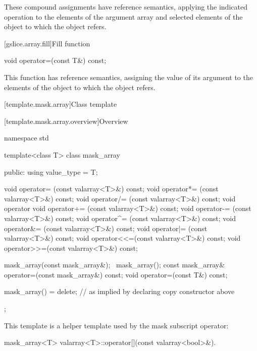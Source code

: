 \begin{itemdescr}
\pnum
These compound assignments have reference semantics, applying the
indicated operation to the elements of the argument array and selected
elements of the
object to which the
object refers.
\end{itemdescr}

[gslice.array.fill]{Fill function}

%
\begin{itemdecl}
void operator=(const T&) const;
\end{itemdecl}

\begin{itemdescr}
\pnum
This function has reference semantics, assigning the value of its argument
to the elements of the
object to which the
object refers.
\end{itemdescr}

[template.mask.array]{Class template }

[template.mask.array.overview]{Overview}

%
%
\begin{codeblock}
namespace std {
  template<class T> class mask_array {
  public:
    using value_type = T;

    void operator=  (const valarray<T>&) const;
    void operator*= (const valarray<T>&) const;
    void operator/= (const valarray<T>&) const;
    void operator%
    void operator+= (const valarray<T>&) const;
    void operator-= (const valarray<T>&) const;
    void operator^= (const valarray<T>&) const;
    void operator&= (const valarray<T>&) const;
    void operator|= (const valarray<T>&) const;
    void operator<<=(const valarray<T>&) const;
    void operator>>=(const valarray<T>&) const;

    mask_array(const mask_array&);
    ~mask_array();
    const mask_array& operator=(const mask_array&) const;
    void operator=(const T&) const;

    mask_array() = delete;        // as implied by declaring copy constructor above
  };
}
\end{codeblock}

\pnum
This template is a helper template used by the mask subscript operator:

%
\begin{itemdecl}
mask_array<T> valarray<T>::operator[](const valarray<bool>&).
\end{itemdecl}

